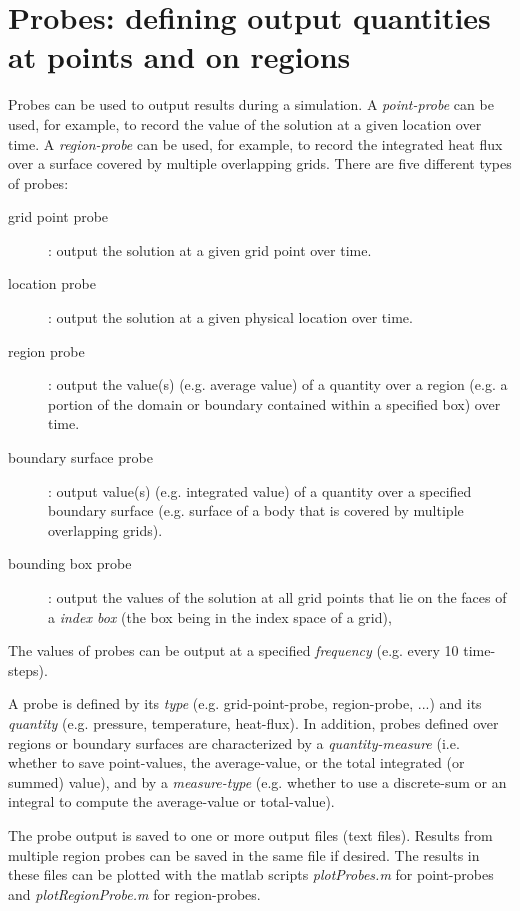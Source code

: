 %
\section{Probes: defining output quantities at points and on regions} \label{sec:probes}


Probes can be used to output results during a simulation. 
A {\em point-probe} can be used, for example, to record the value of the solution at a given location over time.
A {\em region-probe} can be used, for example, to record the integrated heat flux over a surface covered by multiple
overlapping grids.
% 
There are five different types of probes: 
\begin{description}
   \item[\quad grid point probe] : output the solution at a given grid point over time.
   \item[\quad location probe] : output the solution at a given physical location over time.
   \item[\quad region probe] : output the value(s) (e.g. average value) of a quantity over a region 
      (e.g. a portion of the domain or boundary contained within a specified box) over time.
   \item[\quad boundary surface probe] : output value(s) (e.g. integrated value) of a quantity over a specified boundary surface (e.g. surface
        of a body that is covered by multiple overlapping grids).
   \item[\quad bounding box probe] : output the values of the solution at all grid points that lie
    on the faces of a {\em index box} (the box being in the index space of a grid),
\end{description}
The values of probes can be output at a specified {\em frequency} (e.g. every 10 time-steps).

A probe is defined by its {\em type} (e.g. grid-point-probe, region-probe, ...) and its
{\em quantity} (e.g. pressure, temperature, heat-flux). In addition,
probes defined over regions or boundary surfaces are characterized 
by a {\em quantity-measure} (i.e. whether to save point-values, the average-value, or the total integrated (or summed) value),
and by a {\em measure-type} (e.g. whether to use a discrete-sum or an integral to compute the average-value or total-value).


The probe output is saved to one or more output files (text files). Results from multiple region probes can
be saved in the same file if desired. The
results in these files can be plotted with the matlab scripts {\em plotProbes.m} for point-probes
and {\em plotRegionProbe.m} for region-probes.


